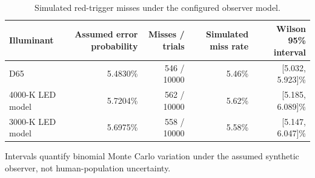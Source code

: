 \begin{table}[!t]
\caption{Simulated red-trigger misses under the configured observer model.}
\label{tab:triggers}\centering\small
\begin{tabular}{lrrrr}
\toprule
Illuminant & Assumed error probability & Misses / trials & Simulated miss rate & Wilson 95\% interval \\
\midrule
D65 & 5.4830\% & 546 / 10000 & 5.46\% & [5.032, 5.923]\% \\
4000-K LED model & 5.7204\% & 562 / 10000 & 5.62\% & [5.185, 6.089]\% \\
3000-K LED model & 5.6975\% & 558 / 10000 & 5.58\% & [5.147, 6.047]\% \\
\bottomrule
\end{tabular}
\par\vspace{3pt}\footnotesize Intervals quantify binomial Monte Carlo variation under the assumed synthetic observer, not human-population uncertainty.
\end{table}
